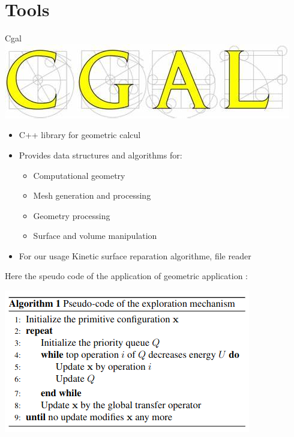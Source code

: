 \documentclass[10pt]{beamer}
\begin{document}
\section{Tools}
\begin{frame}{Cgal}
    \includegraphics[scale = 0.2]{../../images/CGAL_logo.png}
    \begin{itemize}
        \item C++ library for geometric calcul 
        \item Provides data structures and algorithms for:
        \begin{itemize}
            \item Computational geometry
            \item Mesh generation and processing
            \item Geometry processing
            \item Surface and volume manipulation
        \end{itemize}
        \item For our usage Kinetic surface reparation algorithme, file reader
    \end{itemize}
\end{frame}
\begin{frame}
    
Here the speudo code of the application of geometric application : 

\begin{center}
    \includegraphics[scale =  0.5]{../../images/Pseudo_code_exploration.png}
  \end{center} 
\end{frame}
\end{document}
